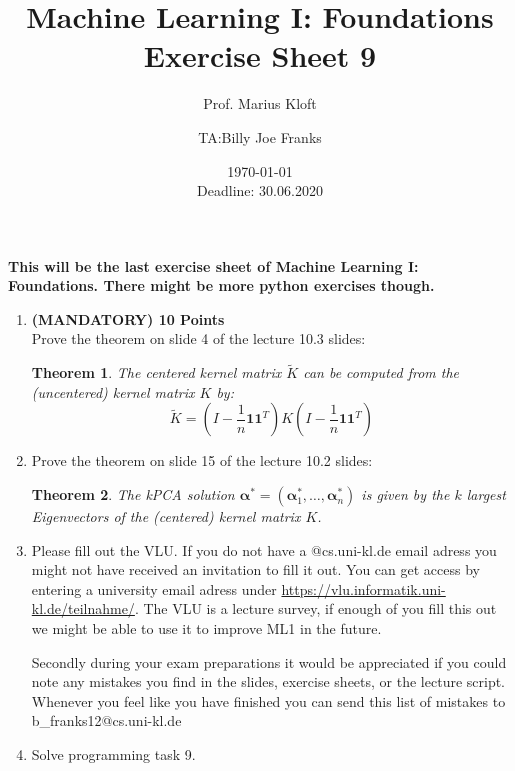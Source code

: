 \documentclass[]{scrartcl}
\author{Prof. Marius Kloft \and TA:Billy Joe Franks}
\title{Machine Learning I: Foundations \\ Exercise Sheet 9}
\date{\today\\Deadline: 30.06.2020}
\newcommand{\balpha}{\mathbf{\alpha}}
\newcommand{\bone}{\mathbf{1}}
\newtheorem{thm}{Theorem}
\begin{document}
\maketitle
\textbf{This will be the last exercise sheet of Machine Learning I: Foundations. There might be more python exercises though.}
\begin{enumerate}

\item \textbf{(MANDATORY) 10 Points}\\ Prove the theorem on slide 4 of the lecture 10.3 slides:
	\begin{thm}
		The centered kernel matrix $\tilde{K}$ can be computed from the (uncentered) kernel matrix $K$ by: \[\tilde{K}=\left(I-\frac{1}{n}\bone\bone^T\right)K\left(I-\frac{1}{n}\bone\bone^T\right)\]
	\end{thm}

\item Prove the theorem on slide 15 of the lecture 10.2 slides:
	\begin{thm}
		The kPCA solution $\balpha^* = \left(\balpha_1^*, \ldots, \balpha_n^* \right)$ is given by the $k$ largest Eigenvectors of the (centered) kernel matrix $K$.
	\end{thm}

\item Please fill out the VLU. If you do not have a @cs.uni-kl.de email adress you might not have received an invitation to fill it out. You can get access by entering a university email adress under \url{https://vlu.informatik.uni-kl.de/teilnahme/}. The VLU is a lecture survey, if enough of you fill this out we might be able to use it to improve ML1 in the future.

Secondly during your exam preparations it would be appreciated if you could note any mistakes you find in the slides, exercise sheets, or the lecture script. Whenever you feel like you have finished you can send this list of mistakes to b\_franks12@cs.uni-kl.de

\item Solve programming task 9.
\end{enumerate}
\end{document}
